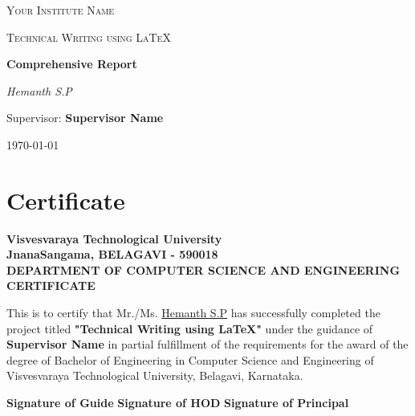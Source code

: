 \documentclass[12pt,a4paper]{report}
\begin{document}
\begin{titlepage}
    \centering
    {\scshape\LARGE Your Institute Name \par}
    \vspace{1cm}
    {\scshape\Large Technical Writing using LaTeX\par}
    \vspace{1.5cm}
    {\huge\bfseries Comprehensive Report\par}
    \vspace{2cm}
    {\Large\itshape Hemanth S.P\par}
    \vfill
    Supervisor: \textbf{Supervisor Name}

    \vfill

    {\large \today\par}
\end{titlepage}

\chapter*{Certificate}
\thispagestyle{empty}
\begin{center}
    \textbf{\large Visvesvaraya Technological University}\\
    \textbf{\small JnanaSangama, BELAGAVI - 590018}\\
    \vspace{0.5cm}
    \textbf{\small DEPARTMENT OF COMPUTER SCIENCE AND ENGINEERING}\\
    \vspace{0.5cm}
    \textbf{\large CERTIFICATE}
\end{center}
\vspace{0.5cm}
\justify
This is to certify that Mr./Ms. \underline{Hemanth S.P}{\hspace{0.1cm}} has successfully completed the project titled \textbf{"Technical Writing using LaTeX"} under the guidance of \textbf{Supervisor Name} in partial fulfillment of the requirements for the award of the degree of Bachelor of Engineering in Computer Science and Engineering of Visvesvaraya Technological University, Belagavi, Karnataka.
\vspace{1cm}

\begin{flushleft}
\textbf{Signature of Guide} \hfill \textbf{Signature of HOD} \hfill \textbf{Signature of Principal}
\end{flushleft}

\newpage
\end{document}
